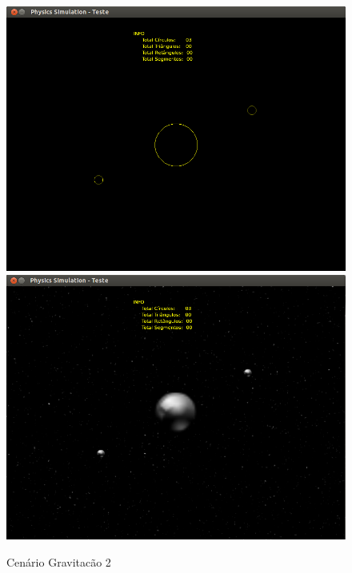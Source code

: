   \begin{figure}
	\centering
	\caption{Cenário Gravitacão 2}
    \includegraphics[scale=0.4]{images/cenario-gravitacao-3.png}
    \includegraphics[scale=0.4]{images/cenario-gravitacao-4.png}
  \end{figure}

